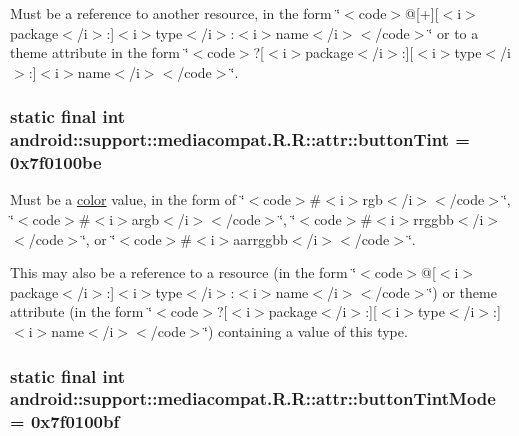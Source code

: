 Must be a reference to another resource, in the form \char`\"{}$<$code$>$@\mbox{[}+\mbox{]}\mbox{[}$<$i$>$package$<$/i$>$:\mbox{]}$<$i$>$type$<$/i$>$:$<$i$>$name$<$/i$>$$<$/code$>$\char`\"{} or to a theme attribute in the form \char`\"{}$<$code$>$?\mbox{[}$<$i$>$package$<$/i$>$:\mbox{]}\mbox{[}$<$i$>$type$<$/i$>$:\mbox{]}$<$i$>$name$<$/i$>$$<$/code$>$\char`\"{}. \hypertarget{classandroid_1_1support_1_1mediacompat_1_1_r_1_1attr_a4ed493ebeb7e0634857b64c5057ff7a}{
\subsubsection[{buttonTint}]{\setlength{\rightskip}{0pt plus 5cm}static final int android::support::mediacompat.R.R::attr::buttonTint = 0x7f0100be}}
\label{classandroid_1_1support_1_1mediacompat_1_1_r_1_1attr_a4ed493ebeb7e0634857b64c5057ff7a}


Must be a \hyperlink{classandroid_1_1support_1_1mediacompat_1_1_r_1_1color}{color} value, in the form of \char`\"{}$<$code$>$\#$<$i$>$rgb$<$/i$>$$<$/code$>$\char`\"{}, \char`\"{}$<$code$>$\#$<$i$>$argb$<$/i$>$$<$/code$>$\char`\"{}, \char`\"{}$<$code$>$\#$<$i$>$rrggbb$<$/i$>$$<$/code$>$\char`\"{}, or \char`\"{}$<$code$>$\#$<$i$>$aarrggbb$<$/i$>$$<$/code$>$\char`\"{}. 

This may also be a reference to a resource (in the form \char`\"{}$<$code$>$@\mbox{[}$<$i$>$package$<$/i$>$:\mbox{]}$<$i$>$type$<$/i$>$:$<$i$>$name$<$/i$>$$<$/code$>$\char`\"{}) or theme attribute (in the form \char`\"{}$<$code$>$?\mbox{[}$<$i$>$package$<$/i$>$:\mbox{]}\mbox{[}$<$i$>$type$<$/i$>$:\mbox{]}$<$i$>$name$<$/i$>$$<$/code$>$\char`\"{}) containing a value of this type. \hypertarget{classandroid_1_1support_1_1mediacompat_1_1_r_1_1attr_26804783b639b12b4e2b7a0fb5425252}{
\subsubsection[{buttonTintMode}]{\setlength{\rightskip}{0pt plus 5cm}static final int android::support::mediacompat.R.R::attr::buttonTintMode = 0x7f0100bf}}
\label{classandroid_1_1support_1_1mediacompat_1_1_r_1_1attr_26804783b639b12b4e2b7a0fb5425252}


